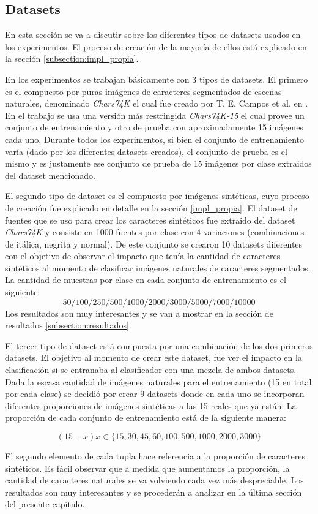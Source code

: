 \subsection{Datasets}


	En esta sección se va a discutir sobre los diferentes tipos de datasets usados en los experimentos. El proceso de creación de la mayoría de ellos está explicado en la sección \ref{subsection:impl_propia}.
	
	En los experimentos se trabajan básicamente con 3 tipos de datasets. El primero es el compuesto por puras imágenes de caracteres segmentados de escenas naturales, denominado \textit{Chars74K} el cual fue creado por T. E. Campos et al. en \cite{dCBV09}. En el trabajo se usa una versión más restringida \textit{Chars74K-15} el cual provee un conjunto de entrenamiento y otro de prueba con aproximadamente 15 imágenes cada uno. Durante todos los experimentos, si bien el conjunto de entrenamiento varía (dado por los diferentes datasets creados), el conjunto de prueba es el mismo y es justamente ese conjunto de prueba de 15 imágenes por clase extraidos del dataset mencionado.
	
	El segundo tipo de dataset es el compuesto por imágenes sintéticas, cuyo proceso de creación fue explicado en detalle en la sección \ref{impl_propia}. El dataset de fuentes que se uso para crear los caracteres sintéticos fue extraido del dataset \textit{Chars74K} y consiste en 1000 fuentes por clase con 4 variaciones (combinaciones de itálica, negrita y normal). De este conjunto se crearon 10 datasets diferentes con el objetivo de observar el impacto que tenía la cantidad de caracteres sintéticos al momento de clasificar imágenes naturales de caracteres segmentados. La cantidad de muestras por clase en cada conjunto de entrenamiento es el siguiente:
	 $$50/100/250/500/1000/2000/3000/5000/7000/10000$$
	 Los resultados son muy interesantes y se van a mostrar en la sección de resultados \ref{subsection:resultados}.
	
	El tercer tipo de dataset está compuesta por una combinación de los dos primeros datasets. El objetivo al momento de crear este dataset, fue ver el impacto en la clasificación si se entranaba al clasificador con una mezcla de ambos datasets. Dada la escasa cantidad de imágenes naturales para el entrenamiento (15 en total por cada clase) se decidió por crear 9 datasets donde en cada uno se incorporan diferentes proporciones de imágenes sintéticas a las 15 reales que ya están. La proporción de cada conjunto de entrenamiento está de la siguiente manera: 
	
	$$(15-x) x \in \{ 15,30,45,60,100,500,1000,2000,3000 \}$$
	
	El segundo elemento de cada tupla hace referencia a la proporción de caracteres sintéticos. Es fácil observar que a medida que aumentamos la proporción, la cantidad de caracteres naturales se va volviendo cada vez más despreciable. Los resultados son muy interesantes y se procederán a analizar en la última sección del presente capítulo.
	
